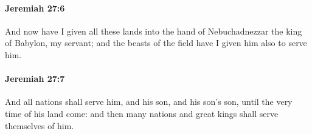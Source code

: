 		\paragraph{Jeremiah 27:6} %
			\label{JEREMIAH-27-6}

			And now have I given all these lands into the hand of Nebuchadnezzar the king of Babylon, my servant; and the beasts of the field have I given him also to serve him.


		\paragraph{Jeremiah 27:7} %
			\label{JEREMIAH-27-7}

			And all nations shall serve him, and his son, and his son’s son, until the very time of his land come: and then many nations and great kings shall serve themselves of him.


